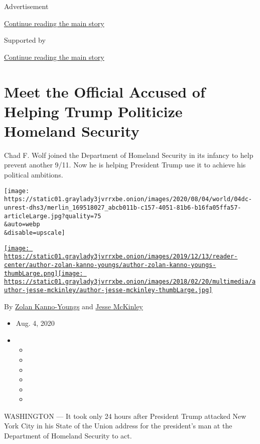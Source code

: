 Advertisement

\protect\hyperlink{after-top}{Continue reading the main story}

Supported by

\protect\hyperlink{after-sponsor}{Continue reading the main story}

\hypertarget{meet-the-official-accused-of-helping-trump-politicize-homeland-security}{%
\section{Meet the Official Accused of Helping Trump Politicize Homeland
Security}\label{meet-the-official-accused-of-helping-trump-politicize-homeland-security}}

Chad F. Wolf joined the Department of Homeland Security in its infancy
to help prevent another 9/11. Now he is helping President Trump use it
to achieve his political ambitions.

\texttt{[image: https://static01.graylady3jvrrxbe.onion/images/2020/08/04/world/04dc-unrest-dhs3/merlin\_169518027\_abcb011b-c157-4051-81b6-b16fa05ffa57-articleLarge.jpg?quality=75\\\&auto=webp\\\&disable=upscale]}

\href{https://www.nytimes3xbfgragh.onion/by/zolan-kanno-youngs}{\texttt{[image: https://static01.graylady3jvrrxbe.onion/images/2019/12/13/reader-center/author-zolan-kanno-youngs/author-zolan-kanno-youngs-thumbLarge.png]}}\href{https://www.nytimes3xbfgragh.onion/by/jesse-mckinley}{\texttt{[image: https://static01.graylady3jvrrxbe.onion/images/2018/02/20/multimedia/author-jesse-mckinley/author-jesse-mckinley-thumbLarge.jpg]}}

By \href{https://www.nytimes3xbfgragh.onion/by/zolan-kanno-youngs}{Zolan
Kanno-Youngs} and
\href{https://www.nytimes3xbfgragh.onion/by/jesse-mckinley}{Jesse
McKinley}

\begin{itemize}
\item
  Aug. 4, 2020
\item
  \begin{itemize}
  \item
  \item
  \item
  \item
  \item
  \item
  \end{itemize}
\end{itemize}

WASHINGTON --- It took only 24 hours after President Trump attacked New
York City in his State of the Union address for the president's man at
the Department of Homeland Security to act.

